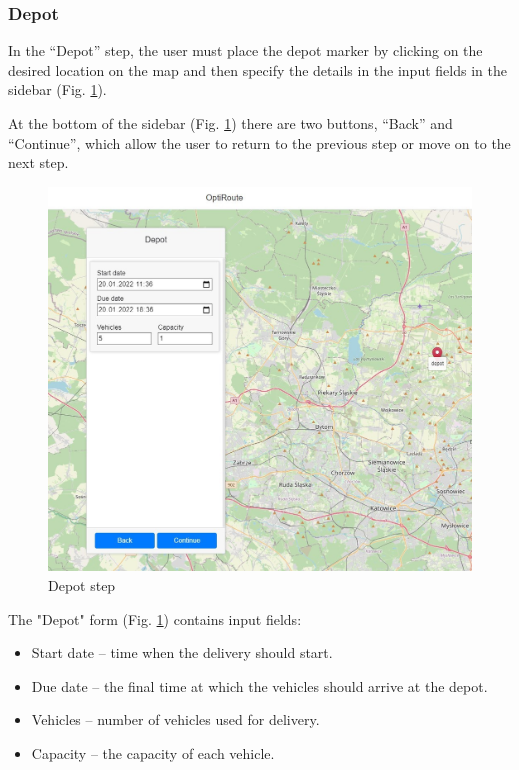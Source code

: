 \documentclass[a4paper,twoside,12pt]{book}
\begin{document}
\subsubsection{Depot}
In the ``Depot'' step, the user must place the depot marker by clicking on the desired location on the map and then specify the details in the input fields in the sidebar (Fig. \ref{fig:depot}).



At the bottom of the sidebar (Fig. \ref{fig:depot}) there are two buttons, ``Back'' and ``Continue'', which allow the user to return to the previous step or move on to the next step.

\begin{figure}[htb]
\centering
\includegraphics[width=\textwidth]{images/depot_updated.jpg}
\caption{Depot step}
\label{fig:depot}
\end{figure}

The "Depot" form (Fig. \ref{fig:depot}) contains input fields:
\begin{itemize}
    \item Start date -- time when the delivery should start.
    \item Due date -- the final time at which the vehicles should arrive at the depot.
    \item Vehicles -- number of vehicles used for delivery.
    \item Capacity -- the capacity of each vehicle.
\end{itemize}
\end{document}
